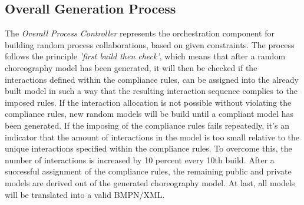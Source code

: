 \documentclass[runningheads]{llncs}
\begin{document}
\subsection{Overall Generation Process} \label{sec:overallprocesscontroller}
The \textit{Overall Process Controller} represents the orchestration component for building random process collaborations, based on given constraints. The process follows the principle \textit{'first build then check'}, which means that after a random choreography model has been generated, it will then be checked if the interactions defined within the compliance rules, can be assigned into the already built model in such a way that the resulting interaction sequence complies to the imposed rules. If the interaction allocation is not possible without violating the compliance rules, new random models will be build until a compliant model has been generated. If the imposing of the compliance rules fails repeatedly, it's an indicator that the amount of interactions in the model is too small relative to the unique interactions specified within the compliance rules. To overcome this, the number of interactions is increased by 10 percent every 10th build. After a successful assignment of the compliance rules, the remaining public and private models are derived out of the generated choreography model. At last, all models will be translated into a valid BMPN/XML.






%
%
%


%
\end{document}
